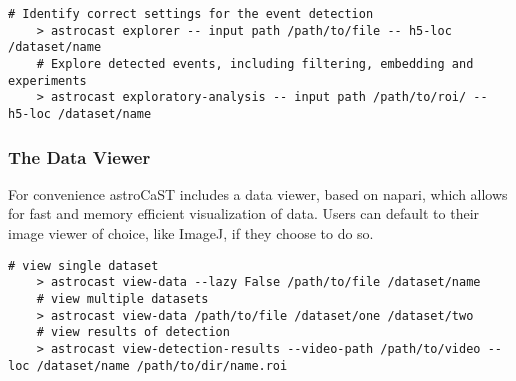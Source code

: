\begin{lstlisting}[style=bashStyle]
    # Identify correct settings for the event detection
    > astrocast explorer -- input path /path/to/file -- h5-loc /dataset/name
    # Explore detected events, including filtering, embedding and experiments
    > astrocast exploratory-analysis -- input path /path/to/roi/ -- h5-loc /dataset/name
\end{lstlisting}

\subsubsection{The Data Viewer}

For convenience astroCaST includes a data viewer, based on napari\citep{sofroniew_nicholas_napari_2022}, which allows for fast and memory efficient visualization of data. Users can default to their image viewer of choice, like ImageJ, if they choose to do so.

\begin{lstlisting}[style=bashStyle]
    # view single dataset
    > astrocast view-data --lazy False /path/to/file /dataset/name
    # view multiple datasets
    > astrocast view-data /path/to/file /dataset/one /dataset/two
    # view results of detection
    > astrocast view-detection-results --video-path /path/to/video --loc /dataset/name /path/to/dir/name.roi
\end{lstlisting}

